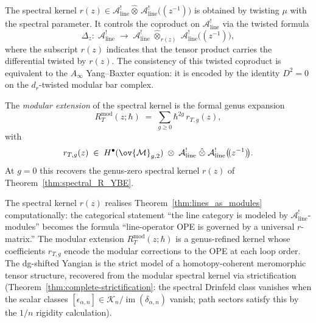 The spectral kernel
$r(z) \in \mathcal{A}^!_{\mathrm{line}} \hat\otimes\, \mathcal{A}^!_{\mathrm{line}}\bigl(\!(z^{-1})\!\bigr)$
is obtained by twisting $\mu$ with the spectral parameter. It controls the coproduct on
$\mathcal{A}^!_{\mathrm{line}}$ via the twisted formula
\begin{equation}
\label{eq:twisted-coproduct}
\Delta_z:\; \mathcal{A}^!_{\mathrm{line}}
\;\longrightarrow\;
\mathcal{A}^!_{\mathrm{line}}
\;\hat\otimes_{r(z)}\;
\mathcal{A}^!_{\mathrm{line}}\bigl(\!(z^{-1})\!\bigr),
\end{equation}
where the subscript $r(z)$ indicates that the tensor product carries the differential
twisted by $r(z)$. The consistency of this twisted coproduct is equivalent to the
$A_\infty$ Yang--Baxter equation: it is encoded by the identity $D^2 = 0$ on the
$d_r$-twisted modular bar complex.

\begin{definition}
\label{def:modular-spectral-kernel}
The \emph{modular extension} of the spectral kernel is the formal genus expansion
\begin{equation}
\label{eq:modular-spectral-kernel}
R_T^{\mathrm{mod}}(z;\hbar)
\;=\;
\sum_{g \geq 0} \hbar^{2g}\, r_{T,g}(z),
\end{equation}
with
\[
r_{T,g}(z)
\;\in\;
H^\bullet(\ov{\mathcal{M}}_{g,2})
\;\otimes\;
\mathcal{A}^!_{\mathrm{line}}
\;\hat\otimes\;
\mathcal{A}^!_{\mathrm{line}}\bigl(\!(z^{-1})\!\bigr).
\]
At $g=0$ this recovers the genus-zero spectral kernel
$r(z)$ of Theorem~\ref{thm:spectral_R_YBE}.
\end{definition}

\begin{remark}
\label{rem:abstract-to-concrete-kernel}
The spectral kernel $r(z)$ realises
Theorem~\ref{thm:lines_as_modules} computationally: the categorical
statement ``the line category is modeled by
$\mathcal{A}^!_{\mathrm{line}}$-modules'' becomes the formula
``line-operator OPE is governed by a universal $r$-matrix.'' The
modular extension $R_T^{\mathrm{mod}}(z;\hbar)$ is a genus-refined
kernel whose coefficients $r_{T,g}$ encode the modular corrections
to the OPE at each loop order. The dg-shifted Yangian is the strict
model of a homotopy-coherent meromorphic tensor structure, recovered
from the modular spectral kernel via strictification
(Theorem~\ref{thm:complete-strictification}: the spectral Drinfeld
class vanishes when the scalar classes $[\epsilon_{\alpha,n}]\in
\mathscr K_n/\operatorname{im}(\delta_{\alpha,n})$ vanish; path
sectors satisfy this by the $1/n$ rigidity calculation).
\end{remark}

